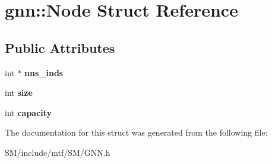 \hypertarget{structgnn_1_1Node}{\section{gnn\-:\-:Node Struct Reference}
\label{structgnn_1_1Node}
}
\subsection*{Public Attributes}
\begin{DoxyCompactItemize}
\item 
\hypertarget{structgnn_1_1Node_a7bdbb0c9f3115de04e8bfcc909686e6f}{int $\ast$ {\bfseries nns\-\_\-inds}}\label{structgnn_1_1Node_a7bdbb0c9f3115de04e8bfcc909686e6f}

\item 
\hypertarget{structgnn_1_1Node_a408827245358c731cf621c2d4bdf7884}{int {\bfseries size}}\label{structgnn_1_1Node_a408827245358c731cf621c2d4bdf7884}

\item 
\hypertarget{structgnn_1_1Node_abfe924f487ad6ba2ea1739892e80f283}{int {\bfseries capacity}}\label{structgnn_1_1Node_abfe924f487ad6ba2ea1739892e80f283}

\end{DoxyCompactItemize}


The documentation for this struct was generated from the following file\-:\begin{DoxyCompactItemize}
\item 
S\-M/include/mtf/\-S\-M/G\-N\-N.\-h\end{DoxyCompactItemize}
